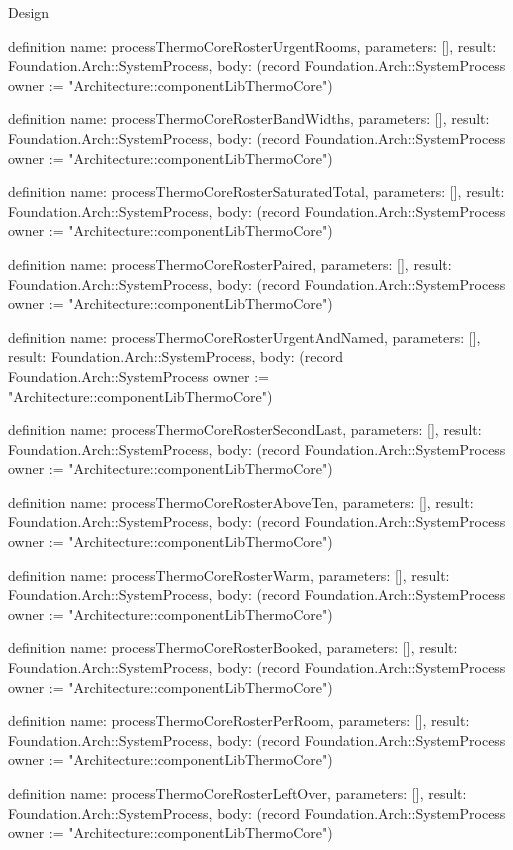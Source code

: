 \begin{lexlean}{Design}
\begin{semanticmodule}
definition{
  name: processThermoCoreRosterUrgentRooms,
  parameters: [],
  result: Foundation.Arch::SystemProcess,
  body: (record Foundation.Arch::SystemProcess {owner := "Architecture::componentLibThermoCore"})
}

definition{
  name: processThermoCoreRosterBandWidths,
  parameters: [],
  result: Foundation.Arch::SystemProcess,
  body: (record Foundation.Arch::SystemProcess {owner := "Architecture::componentLibThermoCore"})
}

definition{
  name: processThermoCoreRosterSaturatedTotal,
  parameters: [],
  result: Foundation.Arch::SystemProcess,
  body: (record Foundation.Arch::SystemProcess {owner := "Architecture::componentLibThermoCore"})
}

definition{
  name: processThermoCoreRosterPaired,
  parameters: [],
  result: Foundation.Arch::SystemProcess,
  body: (record Foundation.Arch::SystemProcess {owner := "Architecture::componentLibThermoCore"})
}

definition{
  name: processThermoCoreRosterUrgentAndNamed,
  parameters: [],
  result: Foundation.Arch::SystemProcess,
  body: (record Foundation.Arch::SystemProcess {owner := "Architecture::componentLibThermoCore"})
}

definition{
  name: processThermoCoreRosterSecondLast,
  parameters: [],
  result: Foundation.Arch::SystemProcess,
  body: (record Foundation.Arch::SystemProcess {owner := "Architecture::componentLibThermoCore"})
}

definition{
  name: processThermoCoreRosterAboveTen,
  parameters: [],
  result: Foundation.Arch::SystemProcess,
  body: (record Foundation.Arch::SystemProcess {owner := "Architecture::componentLibThermoCore"})
}

definition{
  name: processThermoCoreRosterWarm,
  parameters: [],
  result: Foundation.Arch::SystemProcess,
  body: (record Foundation.Arch::SystemProcess {owner := "Architecture::componentLibThermoCore"})
}

definition{
  name: processThermoCoreRosterBooked,
  parameters: [],
  result: Foundation.Arch::SystemProcess,
  body: (record Foundation.Arch::SystemProcess {owner := "Architecture::componentLibThermoCore"})
}

definition{
  name: processThermoCoreRosterPerRoom,
  parameters: [],
  result: Foundation.Arch::SystemProcess,
  body: (record Foundation.Arch::SystemProcess {owner := "Architecture::componentLibThermoCore"})
}

definition{
  name: processThermoCoreRosterLeftOver,
  parameters: [],
  result: Foundation.Arch::SystemProcess,
  body: (record Foundation.Arch::SystemProcess {owner := "Architecture::componentLibThermoCore"})
}


\end{semanticmodule}
\end{lexlean}
